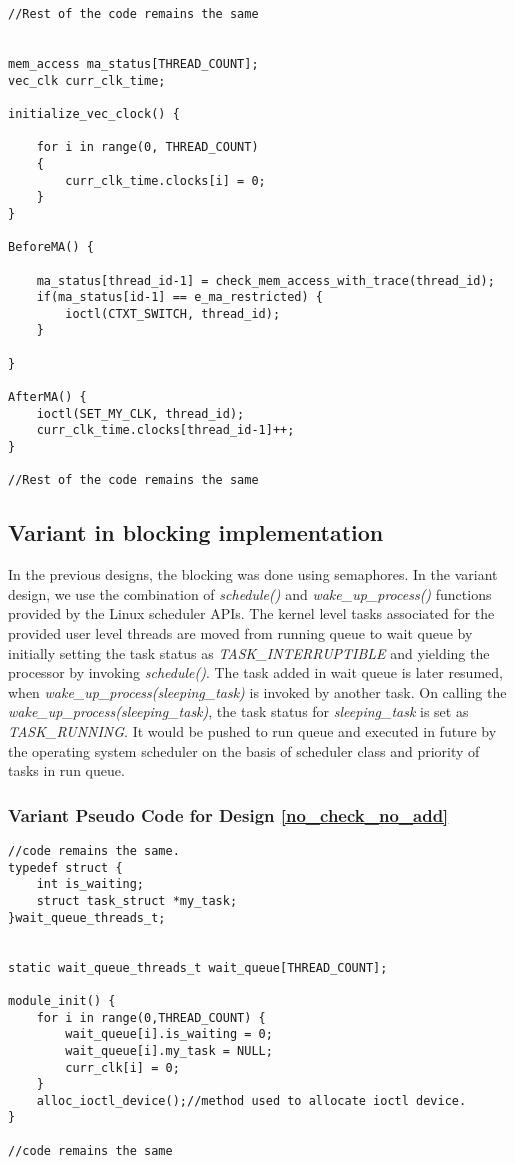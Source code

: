 \begin{lstlisting}[title=User Space Implementation, style=customc]
//Rest of the code remains the same


mem_access ma_status[THREAD_COUNT];
vec_clk curr_clk_time;

initialize_vec_clock() {

    for i in range(0, THREAD_COUNT)
    {
        curr_clk_time.clocks[i] = 0;
    }
}

BeforeMA() {

	ma_status[thread_id-1] = check_mem_access_with_trace(thread_id);
	if(ma_status[id-1] == e_ma_restricted) {
		ioctl(CTXT_SWITCH, thread_id);	
	}
	  
}

AfterMA() {	
	ioctl(SET_MY_CLK, thread_id);
	curr_clk_time.clocks[thread_id-1]++;
}

//Rest of the code remains the same

\end{lstlisting}

\subsection{Variant in blocking implementation}

In the previous designs, the blocking was done using semaphores. 
In the variant design, we use the combination of \emph{schedule()} and \emph{wake\_up\_process()} functions provided by the Linux scheduler APIs. 
The kernel level tasks associated for the provided user level threads are moved from running queue to wait queue by initially setting the task status as \emph{TASK\_INTERRUPTIBLE} and yielding the processor by invoking \emph{schedule()}. 
The task added in wait queue is later resumed, when \emph{wake\_up\_process(sleeping\_task)} is invoked by another task. 
On calling the \emph{wake\_up\_process(sleeping\_task)}, the task status for \emph{sleeping\_task} is set as \emph{TASK\_RUNNING}. 
It would be pushed to run queue and executed in future by the operating system scheduler on the basis of scheduler class and priority of tasks in run queue. 
 
 
\subsubsection*{Variant Pseudo Code for Design \ref{no_check_no_add}}

\begin{lstlisting}[title=Kernel Space - General module definitions, style=customc]
//code remains the same.
typedef struct {
	int is_waiting;
	struct task_struct *my_task;
}wait_queue_threads_t;


static wait_queue_threads_t wait_queue[THREAD_COUNT];

module_init() {
	for i in range(0,THREAD_COUNT) {
		wait_queue[i].is_waiting = 0; 
		wait_queue[i].my_task = NULL;
		curr_clk[i] = 0;
	}
	alloc_ioctl_device();//method used to allocate ioctl device.
}

//code remains the same
\end{lstlisting}

